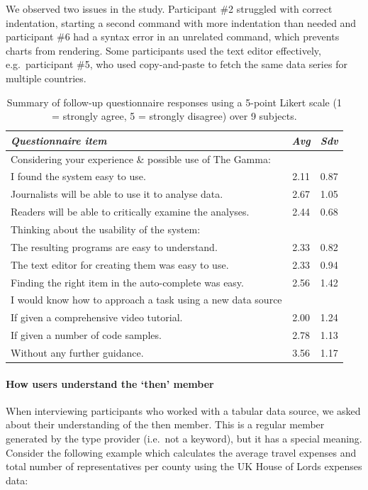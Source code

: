 \documentclass{sigchi}
\newcommand{\ikvd}[1]{{\fontfamily{zi4}\selectfont\small #1}}
\begin{document}
We observed two issues in the study. Participant \#2 struggled with correct indentation, starting a second command
with more indentation than needed and participant \#6 had a syntax error in an unrelated command,
which prevents charts from rendering. Some participants used the text editor effectively,
e.g.~participant \#5, who used copy-and-paste to fetch the same data series for multiple countries.

\begin{table}
  \centering
  \begin{tabular}{p{19em} c c}
    \toprule
      {\small \textit{Questionnaire item}} & {\small \textit{Avg}} & {\small \textit{Sdv}} \\
    \midrule
    \small Considering your experience \& possible use of The Gamma:\\
    \small \quad I found the system easy to use. & \small 2.11 & \small 0.87\\
    \small \quad Journalists will be able to use it to analyse data. & \small 2.67 & \small 1.05\\
    \small \quad Readers will be able to critically examine the analyses. & \small 2.44 & \small 0.68\\
    \small Thinking about the usability of the system:\\
    \small \quad The resulting programs are easy to understand. & \small 2.33 & \small 0.82\\
    \small \quad The text editor for creating them was easy to use. & \small 2.33 & \small 0.94\\
    \small \quad Finding the right item in the auto-complete was easy. & \small 2.56 & \small 1.42\\
    \small I would know how to approach a task using a new data source\\
    \small \quad If given a comprehensive video tutorial. & \small 2.00 & \small 1.24\\
    \small \quad If given a number of code samples. & \small 2.78 & \small 1.13\\
    \small \quad Without any further guidance. & \small 3.56 & \small 1.17\\
    \bottomrule
  \end{tabular}
  \caption{Summary of follow-up questionnaire responses using
    a 5-point Likert scale (1 = strongly agree, 5 = strongly disagree) over 9 subjects.}
  \label{tab:quest}
\end{table}

\paragraph{How users understand the `then' member}
When interviewing participants who worked with a tabular data source, we
asked about their understanding of the \ikvd{then} member. This is a regular member generated by the
type provider (i.e.~not a keyword), but it has a special meaning. Consider
the following example which calculates the average travel expenses and total number of
representatives per county using the UK House of Lords expenses data:
\end{document}
